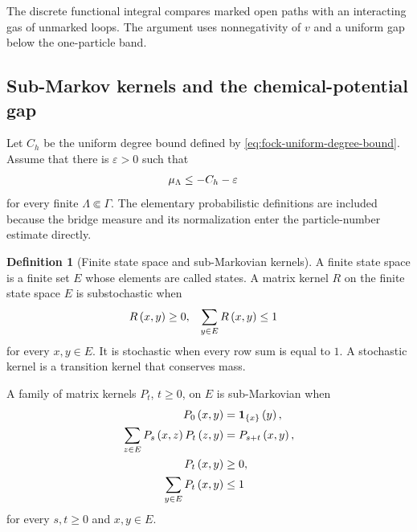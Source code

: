 \documentclass[11pt,a4paper]{article}
\theoremstyle{plain}
\theoremstyle{definition}
\newtheorem{defn}[thm]{Definition}
\theoremstyle{remark}
\begin{document}
The discrete functional integral compares marked open paths with an interacting gas of unmarked loops. The argument uses nonnegativity of \(v\) and a uniform gap below the one-particle band.

\subsection{Sub-Markov kernels and the chemical-potential gap}\label{sub-markov-kernels-and-the-chemical-potential-gap}

Let \(C_h\) be the uniform degree bound defined by \eqref{eq:fock-uniform-degree-bound}. Assume that there is \(\varepsilon > 0\) such that \begin{equation}
\begin{aligned}
\smchemicalpotential_{\Lambda}
& \leq
-C_h - \varepsilon
\end{aligned}
\label{eq:fock-path-chemical-potential-gap}
\end{equation} for every finite \(\Lambda \Subset \Gamma\). The elementary probabilistic definitions are included because the bridge measure and its normalization enter the particle-number estimate directly.

\begin{defn}[Finite state space and sub-Markovian kernels]\label{def:fock-finite-state-space-submarkov}
A finite state space is a finite set $E$ whose elements are called states.
A matrix kernel $R$ on the finite state space $E$ is substochastic when
$$\begin{aligned}
R \left( x,y \right)
& \geq
0,
&
\sum_{y\in E}R \left( x,y \right)
& \leq
1
\end{aligned}$$
for every $x,y\in E$.
It is stochastic when every row sum is equal to $1$.
A stochastic kernel is a transition kernel that conserves mass.

A family of matrix kernels $P_t$, $t\geq0$, on $E$ is sub-Markovian when
$$\begin{aligned}
P_0 \left( x,y \right)
& =
\boldsymbol{1}_{\left\{ x \right\}} \left( y \right),
\\
\sum_{z\in E}
P_s \left( x,z \right)P_t \left( z,y \right)
& =
P_{s+t} \left( x,y \right),
\\
P_t \left( x,y \right)
& \geq
0,
\\
\sum_{y\in E}P_t \left( x,y \right)
&\leq
1
\end{aligned}$$
for every $s,t\geq0$ and $x,y\in E$.
\end{defn}
\end{document}
